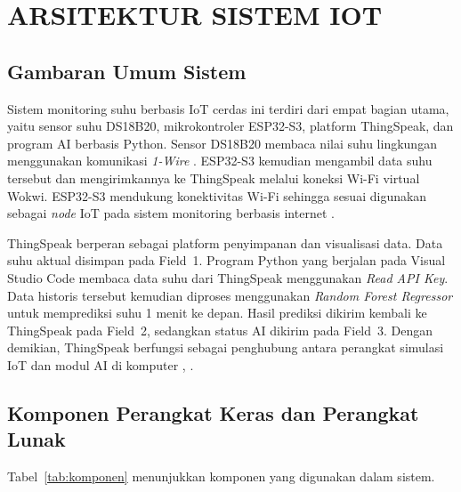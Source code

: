 \chapter{ARSITEKTUR SISTEM IOT}

\section{Gambaran Umum Sistem}

Sistem monitoring suhu berbasis IoT cerdas ini terdiri dari empat bagian
utama, yaitu sensor suhu DS18B20, mikrokontroler ESP32-S3, platform
ThingSpeak, dan program AI berbasis Python. Sensor DS18B20 membaca nilai
suhu lingkungan menggunakan komunikasi \textit{1-Wire}
\cite{ds18b20datasheet}. ESP32-S3 kemudian mengambil data suhu tersebut dan
mengirimkannya ke ThingSpeak melalui koneksi Wi-Fi virtual Wokwi. ESP32-S3
mendukung konektivitas Wi-Fi sehingga sesuai digunakan sebagai \textit{node}
IoT pada sistem monitoring berbasis internet \cite{esp32s3espressif}.

ThingSpeak berperan sebagai platform penyimpanan dan visualisasi data. Data
suhu aktual disimpan pada Field~1. Program Python yang berjalan pada Visual
Studio Code membaca data suhu dari ThingSpeak menggunakan \textit{Read API
Key}. Data historis tersebut kemudian diproses menggunakan \textit{Random
Forest Regressor} untuk memprediksi suhu 1 menit ke depan. Hasil prediksi
dikirim kembali ke ThingSpeak pada Field~2, sedangkan status AI dikirim pada
Field~3. Dengan demikian, ThingSpeak berfungsi sebagai penghubung antara
perangkat simulasi IoT dan modul AI di komputer
\cite{thingspeak2024}, \cite{sklearn_rf}.

\section{Komponen Perangkat Keras dan Perangkat Lunak}

Tabel~\ref{tab:komponen} menunjukkan komponen yang digunakan dalam sistem.

